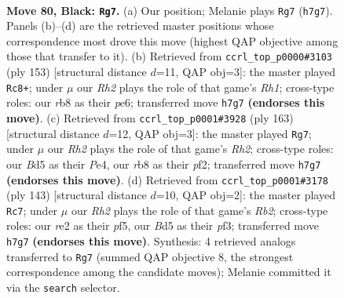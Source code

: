 \documentclass[11pt]{article}
\begin{document}
\clearpage

\begin{figure}[p]\centering
\begin{subfigure}{0.46\textwidth}\centering
\resizebox{\linewidth}{!}{%
\newchessgame
\chessboard[
  setfen={1R6/3k3r/8/3b4/1P6/2K5/4R3/8 b - - 34 80},
  showmover=false,
  pgfstyle=straightmove, color=movearrow, markmove={h7-g7}
]}
\caption{}
\end{subfigure}\hfill
\begin{subfigure}{0.46\textwidth}\centering
\resizebox{\linewidth}{!}{%
\newchessgame
\chessboard[
  setfen={7r/8/4P1k1/4R3/2K5/8/P4b2/8 b - - 2 77},
  showmover=false,
  pgfstyle=straightmove, color=movearrow, markmove={h8-c8}
]}
\caption{}
\end{subfigure}
\\[4pt]
\begin{subfigure}{0.46\textwidth}\centering
\resizebox{\linewidth}{!}{%
\newchessgame
\chessboard[
  setfen={5R2/7r/8/6k1/4p3/8/5PK1/8 b - - 2 82},
  showmover=false,
  pgfstyle=straightmove, color=movearrow, markmove={h7-g7}
]}
\caption{}
\end{subfigure}\hfill
\begin{subfigure}{0.46\textwidth}\centering
\resizebox{\linewidth}{!}{%
\newchessgame
\chessboard[
  setfen={8/1r3k2/8/5PK1/8/R4P2/8/8 b - - 14 72},
  showmover=false,
  pgfstyle=straightmove, color=movearrow, markmove={b7-c7}
]}
\caption{}
\end{subfigure}
\caption{\textbf{Move 80, Black: \texttt{Rg7}.} (a) Our position; Melanie plays \texttt{Rg7} (\texttt{h7g7}). Panels (b)--(d) are the retrieved master positions whose correspondence most drove this move (highest QAP objective among those that transfer to it). (b) Retrieved from \texttt{ccrl\_top\_p0000\#3103} (ply 153) [structural distance $d$=11, QAP obj=3]: the master played \texttt{Rc8+}; under $\mu$ our \emph{Rh2} plays the role of that game's \emph{Rh1}; cross-type roles: our \emph{r}b8 as their \emph{p}e6; transferred move \texttt{h7g7} \textbf{(endorses this move)}. (c) Retrieved from \texttt{ccrl\_top\_p0001\#3928} (ply 163) [structural distance $d$=12, QAP obj=3]: the master played \texttt{Rg7}; under $\mu$ our \emph{Rh2} plays the role of that game's \emph{Rh2}; cross-type roles: our \emph{B}d5 as their \emph{P}e4, our \emph{r}b8 as their \emph{p}f2; transferred move \texttt{h7g7} \textbf{(endorses this move)}. (d) Retrieved from \texttt{ccrl\_top\_p0001\#3178} (ply 143) [structural distance $d$=10, QAP obj=2]: the master played \texttt{Rc7}; under $\mu$ our \emph{Rh2} plays the role of that game's \emph{Rb2}; cross-type roles: our \emph{r}e2 as their \emph{p}f5, our \emph{B}d5 as their \emph{p}f3; transferred move \texttt{h7g7} \textbf{(endorses this move)}. Synthesis: 4 retrieved analogs transferred to \texttt{Rg7} (summed QAP objective 8, the strongest correspondence among the candidate moves); Melanie committed it via the \texttt{search} selector.}
\label{fig:thought-m159}
\end{figure}
\end{document}
